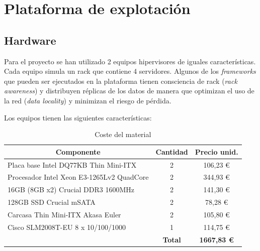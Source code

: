 \documentclass[a4paper,12pt,spanish,final]{epsc_tfc_pfc}
\begin{document}
\pagestyle{fancy}


\chapter{Plataforma de explotación}
\section{Hardware}
Para el proyecto se han utilizado 2 equipos hipervisores de iguales características. Cada equipo simula un rack que contiene 4 servidores. Algunos de los \emph{frameworks} que pueden ser ejecutados en la plataforma tienen consciencia de rack (\emph{rack awareness}) y distribuyen réplicas de los datos de manera que optimizan el uso de la red (\emph{data locality}) y minimizan el riesgo de pérdida.

Los equipos tienen las siguientes características:

\begin{table}[h]
  \centering
  \begin{tabular}{l|c|c|}
    \hline
    \multicolumn{1}{|c|}{\textbf{Componente}}                       & \textbf{Cantidad} & \textbf{Precio unid.}  \\ \hline
    \multicolumn{1}{|l|}{Placa base Intel DQ77KB Thin Mini-ITX}     & 2                 & 106,23 \euro           \\ \hline
    \multicolumn{1}{|l|}{Procesador Intel Xeon E3-1265Lv2 QuadCore} & 2                 & 344,93 \euro           \\ \hline
    \multicolumn{1}{|l|}{16GB (8GB x2) Crucial DDR3 1600MHz}        & 2                 & 141,30 \euro           \\ \hline
    \multicolumn{1}{|l|}{128GB SSD Crucial mSATA}                   & 2                 & 78,28 \euro            \\ \hline
    \multicolumn{1}{|l|}{Carcasa Thin Mini-ITX Akasa Euler}         & 2                 & 105,80 \euro           \\ \hline
    \multicolumn{1}{|l|}{Cisco SLM2008T-EU 8 x 10/100/1000}         & 1                 & 114,75 \euro           \\ \hline
                                                                    & \textbf{Total}    & \textbf{1667,83 \euro} \\ \cline{2-3}
  \end{tabular}
  \caption{Coste del material}
\end{table}
\end{document}
